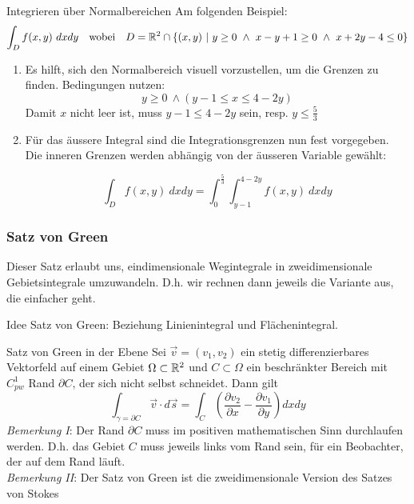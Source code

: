 \begin{Rezept}{Integrieren über Normalbereichen}{}
Am folgenden Beispiel:
\[ \int_D f(x, y) ~ dx dy ~~ \text{ wobei } ~~ D = \mathbb{R}^2 \cap \{(x, y) ~ | ~ y \geq 0 ~ \wedge ~ x-y+1\geq 0 ~ \wedge ~ x+2y-4 \leq 0\}\]
\begin{enumerate}
\item {
Es hilft, sich den Normalbereich visuell vorzustellen, um die Grenzen
zu finden. Bedingungen nutzen:
\[ y \geq 0 ~ \wedge (y-1 \leq x \leq 4-2y) \]
Damit $x$ nicht leer ist, muss $y-1 \leq 4-2y$ sein, resp. $y \leq \frac{5}{3}$ 
}
\item {
Für das äussere Integral sind die Integrationsgrenzen nun fest vorgegeben. Die inneren Grenzen
werden abhängig von der äusseren Variable gewählt:

\[ \int_D f(x,y) ~ dx dy = \int_0^{\frac{5}{3}} \int_{y-1}^{4-2y} f(x,y) ~ dx dy \]

}
\end{enumerate}
\end{Rezept}

\subsubsection{Satz von Green}

Dieser Satz erlaubt uns, eindimensionale Wegintegrale in zweidimensionale Gebietsintegrale umzuwandeln. D.h. wir rechnen dann jeweils die Variante aus, die einfacher geht.

Idee Satz von Green: Beziehung Linienintegral und Flächenintegral.


\begin{Satz}{Satz von Green in der Ebene}{}
	Sei $\vec{v} = (v_1, v_2)$ ein stetig differenzierbares Vektorfeld auf einem Gebiet $\Omega \subset \mathbb{R}^2$ und $C \subset \Omega$ ein beschränkter Bereich mit $C^1_{pw}$ Rand $\partial C$, der sich nicht selbst schneidet. Dann gilt
	\[
		\int_{\gamma=\partial C} \vec{v} \cdot d\vec{s} = 
		\int_C \left(\frac{\partial v_2}{\partial x} - \frac{\partial v_1}{\partial y}\right) dxdy
	\]
	\textit{Bemerkung I}: Der Rand $\partial C$ muss im positiven mathematischen Sinn durchlaufen werden. D.h. das Gebiet $C$ muss jeweils links vom Rand sein, für ein Beobachter, der auf dem Rand läuft.\\
	
	\textit{Bemerkung II}: Der Satz von Green ist die zweidimensionale Version des Satzes von Stokes
\end{Satz}

